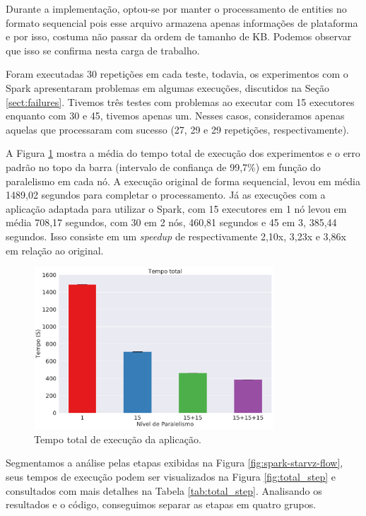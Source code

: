 Durante a implementação, optou-se por manter o processamento de entities
no formato sequencial pois esse arquivo armazena apenas informações de 
plataforma e por isso, costuma não passar da ordem de tamanho de KB. Podemos 
observar que isso se confirma nesta carga de trabalho.

Foram executadas 30 repetições em cada teste, todavia, os experimentos com o 
Spark apresentaram problemas em algumas execuções, discutidos na Seção 
\ref{sect:failures}. Tivemos três testes com problemas ao executar com 15 
executores enquanto com 30 e 45, tivemos apenas um. Nesses casos, consideramos 
apenas aquelas que processaram com sucesso (27, 29 e 29 repetições, 
respectivamente). 

A Figura \ref{fig:total_full} mostra a média do tempo total de execução dos 
experimentos e o erro padrão no topo da barra (intervalo de confiança 
de 99,7\%) em função do paralelismo em cada nó. A execução original 
de forma sequencial, levou em média 1489,02 segundos para completar o 
processamento. Já as execuções com a aplicação adaptada para utilizar o Spark, 
com 15 executores em 1 nó levou em média 708,17 segundos, com 30 em 2 nós, 
460,81 segundos e 45 em 3, 385,44 segundos. Isso consiste em um \textit{speedup} 
de respectivamente 2,10x, 3,23x e 3,86x em relação ao original.

\begin{figure}[ht]
\centerline{
\includegraphics[width=0.8\textwidth]{./img/total.pdf}}
 \caption{Tempo total de execução da aplicação.}
 \label{fig:total_full}
\end{figure}


Segmentamos a análise pelas etapas exibidas na Figura 
\ref{fig:spark-starvz-flow}, seus tempos de execução podem ser visualizados na 
Figura \ref{fig:total_step} e consultados com mais detalhes na Tabela 
\ref{tab:total_step}. Analisando os resultados e o código, conseguimos 
separar as etapas em quatro grupos.

